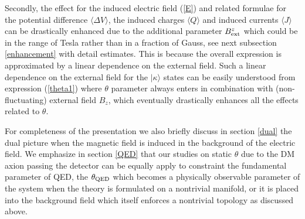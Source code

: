\documentclass[ twocolumn,aps,prd,   
               preprintnumbers,numbers,sort&compress,nofootinbib,
                            showpacs,superscriptaddress,
               colorlinks,
               linkcolor=blue,   
               citecolor=blue]{revtex4-1}   \newcommand{\exclude}[1]{}
\def\la{\langle}
\def\ra{\rangle}
\begin{document}
Secondly,  the effect for the induced electric field (\ref{E}) and  related formulae for the potential difference $\la \Delta V \ra$, the induced charges $\la Q\ra$ and induced currents 
$\la J\ra$ can be drastically  enhanced due to the additional parameter $B^z_{\rm ext}$ which could be in the range of Tesla rather than in a fraction of  Gauss, see next subsection \ref{enhancement} with detail estimates.  
This is because   the overall expression is approximated by a linear dependence on the external field. Such a  linear dependence on the external field  for the   $|\kappa\ra$ states can be easily understood from
expression (\ref{theta1}) where $\theta$ parameter  always enters in combination with (non-fluctuating)  external field $B_z$, 
which eventually drastically enhances all the effects related to $\theta$.
\exclude{Nevertheless, the periodicity $\theta_{\rm eff}\rightarrow  (\theta_{\rm eff}+2\pi n)$ is ultimately enforced by the infinite sum of exponentially suppressed terms in (\ref{E_ind}). In the Poisson resummed expression, the contributions are only coming from very large $n$, which explains the linear dependence of the effects on $B_z$ for leading order contributions.} %

For completeness of the presentation we also briefly discuss in section \ref{dual} the dual picture when the magnetic field is induced in the background of the electric field. We    emphasize  in section  \ref{QED} that  our studies on static $\theta$ due to the DM axion passing the detector can be equally apply to constraint the fundamental parameter of QED, the $\theta_{\rm QED}$ which becomes a physically observable  parameter of the system  when the theory is formulated on a nontrivial manifold, or it  is placed  into the background field which itself enforces a  nontrivial topology  as   discussed   above. 
\end{document}
